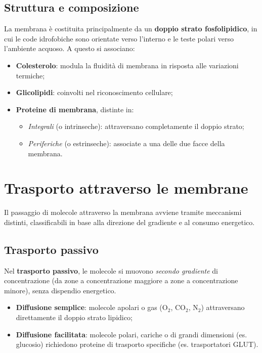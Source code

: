 \documentclass[12pt,a4paper]{report}
\begin{document}
\subsection{Struttura e composizione}
La membrana è costituita principalmente da un \textbf{doppio strato fosfolipidico}, in cui le code idrofobiche sono orientate verso l'interno e le teste polari verso l'ambiente acquoso. A questo si associano:
\begin{itemize}
\item \textbf{Colesterolo}: modula la fluidità di membrana in risposta alle variazioni termiche;
\item \textbf{Glicolipidi}: coinvolti nel riconoscimento cellulare;
\item \textbf{Proteine di membrana}, distinte in:
\begin{itemize}
    \item \textit{Integrali} (o intrinseche): attraversano completamente il doppio strato;
    \item \textit{Periferiche} (o estrinseche): associate a una delle due facce della membrana.
\end{itemize}
\end{itemize}

\section{Trasporto attraverso le membrane}
Il passaggio di molecole attraverso la membrana avviene tramite meccanismi distinti, classificabili in base alla direzione del gradiente e al consumo energetico.
\subsection{Trasporto passivo}
Nel \textbf{trasporto passivo}, le molecole si muovono \textit{secondo gradiente} di concentrazione (da zone a concentrazione maggiore a zone a concentrazione minore), senza dispendio energetico.
\begin{itemize}
\item \textbf{Diffusione semplice}: molecole apolari o gas (\(\mathrm{O_2}\), \(\mathrm{CO_2}\), \(\mathrm{N_2}\)) attraversano direttamente il doppio strato lipidico;
\item \textbf{Diffusione facilitata}: molecole polari, cariche o di grandi dimensioni (es. glucosio) richiedono proteine di trasporto specifiche (es. trasportatori GLUT).
\end{itemize}
\end{document}
